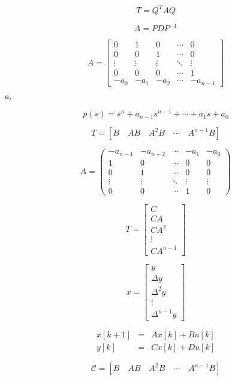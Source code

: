 \documentclass{article}
\begin{document}
\[
T = Q^TAQ
\]
\pagebreak

\[
A = PDP^{-1}
\]
\pagebreak

\[
A = \begin{bmatrix} 
0 & 1 & 0 & \cdots & 0 \\
0 & 0 & 1 & \cdots & 0 \\
\vdots & \vdots & \vdots & \ddots & \vdots \\
0 & 0 & 0 & \cdots & 1 \\
-a_0 & -a_1 & -a_2 & \cdots & -a_{n-1}
\end{bmatrix}
\]
\pagebreak

$a_i$
\pagebreak

\[
p(s) = s^n + a_{n-1}s^{n-1} + \cdots + a_1s + a_0
\]
\pagebreak

\[
T = [B \quad AB \quad A^2B \quad \cdots \quad A^{n-1}B]
\]
\pagebreak

\begin{equation*}
A = \begin{pmatrix} 
-a_{n-1} & -a_{n-2} & \cdots & -a_1 & -a_0 \\
1 & 0 & \cdots & 0 & 0 \\
0 & 1 & \cdots & 0 & 0 \\
\vdots & \vdots & \ddots & \vdots & \vdots \\
0 & 0 & \cdots & 1 & 0
\end{pmatrix}
\end{equation*}
\pagebreak

\[
T = \begin{bmatrix} C \\ CA \\ CA^2 \\ \vdots \\ CA^{n-1} \end{bmatrix}
\]
\pagebreak

\[
x = \begin{bmatrix} y \\ \Delta y \\ \Delta^2 y \\ \vdots \\ \Delta^{n-1} y \end{bmatrix}
\]
\pagebreak

\begin{eqnarray*}
    x[k+1] &=& Ax[k] + Bu[k] \\
    y[k] &=& Cx[k] + Du[k]
    \end{eqnarray*}
\pagebreak

\[
\mathcal{C} = [B \quad AB \quad A^2B \quad \cdots \quad A^{n-1}B]
\]
\pagebreak
\end{document}
